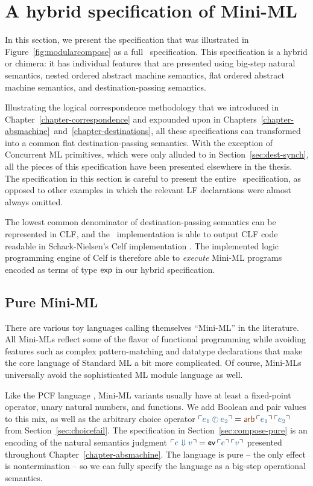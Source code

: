\chapter{A hybrid specification of Mini-ML}
\label{chapter-appendix-hybrid}

In this section, we present the specification that was illustrated in
Figure~\ref{fig:modularcompose} as a full \sls~specification. This
specification is a hybrid or chimera: it has individual features that
are presented using big-step natural semantics, nested ordered abstract
machine semantics, flat ordered abstract machine semantics, and
destination-passing semantics.

Illustrating the logical correspondence methodology that we introduced
in Chapter~\ref{chapter-correspondence} and expounded upon in
Chapters~\ref{chapter-absmachine}~and~\ref{chapter-destinations}, all
these specifications can transformed into a common flat
destination-passing semantics. With the exception of Concurrent ML
primitives, which were only alluded to in
Section~\ref{sec:dest-synch}, all the pieces of this specification
have been presented elsewhere in the thesis. The specification in this
section is careful to present the entire \sls~specification, as
opposed to other examples in which the relevant LF declarations were
almost always omitted.

The lowest common denominator of destination-passing semantics can be
represented in CLF, and the \sls~implementation is able to output CLF
code readable in Schack-Nielsen's Celf implementation
\cite{schacknielsen08celf}. The implemented logic programming engine
of Celf is therefore able to {\it execute} Mini-ML programs encoded as
terms of type ${\sf exp}$ in our hybrid specification.

\section{Pure Mini-ML}

There are various toy languages calling themselves ``Mini-ML'' in the
literature. All Mini-MLs reflect some of the flavor of functional
programming while avoiding features such as complex pattern-matching
and datatype declarations that make the core language of Standard ML
\cite{milner97definition} a bit more complicated.  Of course, Mini-MLs
universally avoid the sophisticated ML module language as well.

Like the PCF language \cite{plotkin77lcf}, Mini-ML variants usually
have at least a fixed-point operator, unary natural numbers, and
functions. We add Boolean and pair values to this mix, as well as the
arbitrary choice operator $\interp{e_1 \arb e_2} = \lf{{\sf
  arb}\,\interp{e_1}\,\interp{e_2}}$ from
Section~\ref{sec:choicefail}. The specification in
Section~\ref{sec:compose-pure} is an encoding of the natural semantics
judgment $\interp{e \Downarrow v} = {\sf ev}\,\interp{e}\,\interp{v}$
presented throughout Chapter~\ref{chapter-absmachine}. The language is
pure -- the only effect is nontermination -- so we can fully specify
the language as a big-step operational semantics.

